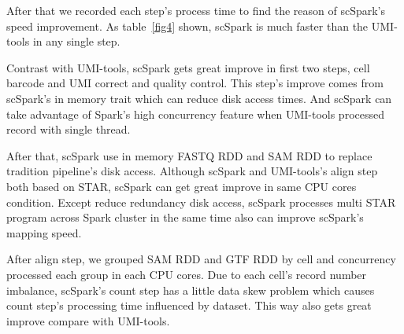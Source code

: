 \documentclass[conference]{IEEEtran}
\begin{document}
After that we recorded each step's process time to find the reason of scSpark's speed improvement.
As table~\ref{fig4} shown, scSpark is much faster than the UMI-tools in any single step.

Contrast with UMI-tools, scSpark gets great improve in first two steps, cell barcode and UMI correct and quality control.
This step's improve comes from scSpark's in memory trait which can reduce disk access times.
And scSpark can take advantage of Spark's high concurrency feature when UMI-tools processed record with single thread.

After that, scSpark use in memory FASTQ RDD and SAM RDD to replace tradition pipeline's disk access. 
Although scSpark and UMI-tools's align step both based on STAR, scSpark can get great improve in same CPU cores condition.
Except reduce redundancy disk access, scSpark processes multi STAR program across Spark cluster in the same time also can improve scSpark's mapping speed.

After align step, we grouped SAM RDD and GTF RDD by cell and concurrency processed each group in each CPU cores.
Due to each cell's record number imbalance, scSpark's count step has a little data skew problem which causes count step's processing time influenced by dataset.
This way also gets great improve compare with UMI-tools.
\end{document}

